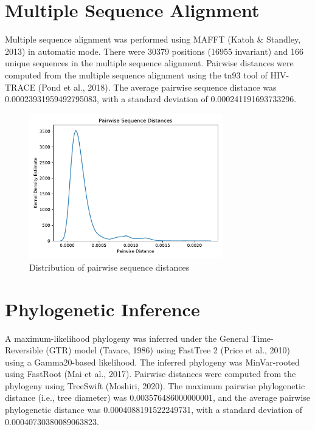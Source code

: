 \documentclass{article}
\begin{document}
\section{Multiple Sequence Alignment}
Multiple sequence alignment was performed using MAFFT (Katoh \& Standley, 2013) in automatic mode.
There were 30379 positions (16955 invariant) and 166 unique sequences in the multiple sequence alignment.
Pairwise distances were computed from the multiple sequence alignment using the tn93 tool of HIV-TRACE (Pond et al., 2018).
The average pairwise sequence distance was 0.00023931959492795083,
with a standard deviation of 0.000241191693733296.


\begin{figure}[h]
\centering
\includegraphics[width=0.75\textwidth]{./figs/pairwise_distances_sequences.pdf}
\caption{Distribution of pairwise sequence distances}
\end{figure}

\section{Phylogenetic Inference}
A maximum-likelihood phylogeny was inferred under the General Time-Reversible (GTR) model (Tavare, 1986) using FastTree 2 (Price et al., 2010) using a Gamma20-based likelihood.
The inferred phylogeny was MinVar-rooted using FastRoot (Mai et al., 2017).
Pairwise distances were computed from the phylogeny using TreeSwift (Moshiri, 2020).
The maximum pairwise phylogenetic distance (i.e., tree diameter) was 0.003576486000000001,
and the average pairwise phylogenetic distance was 0.0004088191522249731,
with a standard deviation of 0.00040730380089063823.
\end{document}
